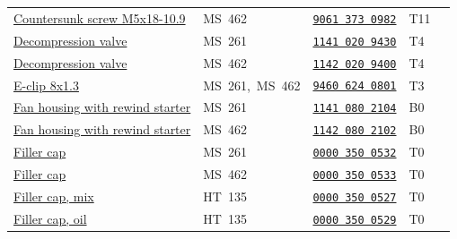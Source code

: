 \documentclass[10pt,letterpaper]{article}
\begin{document}
\begin{longtable}{@{}>{\raggedright\arraybackslash}p{3.18in}p{1.85in}p{1.30in}p{0.38in}r@{}}
\rowcolor{black!6}\hyperlink{90613730982}{Countersunk screw M5x18-10.9} & \textcolor{frkApplication}{\mbox{MS 462}} & \hyperlink{90613730982}{\texttt{9061 373 0982}} & T11 & \pageref{part-90613730982}\\

\hyperlink{11410209430}{Decompression valve} & \textcolor{frkApplication}{\mbox{MS 261}} & \hyperlink{11410209430}{\texttt{1141 020 9430}} & T4 & \pageref{part-11410209430}\\

\rowcolor{black!6}\hyperlink{11420209400}{Decompression valve} & \textcolor{frkApplication}{\mbox{MS 462}} & \hyperlink{11420209400}{\texttt{1142 020 9400}} & T4 & \pageref{part-11420209400}\\

\hyperlink{94606240801}{E-clip 8x1.3} & \textcolor{frkApplication}{\mbox{MS 261, MS 462}} & \hyperlink{94606240801}{\texttt{9460 624 0801}} & T3 & \pageref{part-94606240801}\\

\rowcolor{black!6}\hyperlink{11410802104}{Fan housing with rewind starter} & \textcolor{frkApplication}{\mbox{MS 261}} & \hyperlink{11410802104}{\texttt{1141 080 2104}} & B0 & \pageref{part-11410802104}\\

\hyperlink{11420802102}{Fan housing with rewind starter} & \textcolor{frkApplication}{\mbox{MS 462}} & \hyperlink{11420802102}{\texttt{1142 080 2102}} & B0 & \pageref{part-11420802102}\\

\rowcolor{black!6}\hyperlink{00003500532}{Filler cap} & \textcolor{frkApplication}{\mbox{MS 261}} & \hyperlink{00003500532}{\texttt{0000 350 0532}} & T0 & \pageref{part-00003500532}\\

\hyperlink{00003500533}{Filler cap} & \textcolor{frkApplication}{\mbox{MS 462}} & \hyperlink{00003500533}{\texttt{0000 350 0533}} & T0 & \pageref{part-00003500533}\\

\rowcolor{black!6}\hyperlink{00003500527}{Filler cap, mix} & \textcolor{frkApplication}{\mbox{HT 135}} & \hyperlink{00003500527}{\texttt{0000 350 0527}} & T0 & \pageref{part-00003500527}\\

\hyperlink{00003500529}{Filler cap, oil} & \textcolor{frkApplication}{\mbox{HT 135}} & \hyperlink{00003500529}{\texttt{0000 350 0529}} & T0 & \pageref{part-00003500529}\\


\end{longtable}
\end{document}
